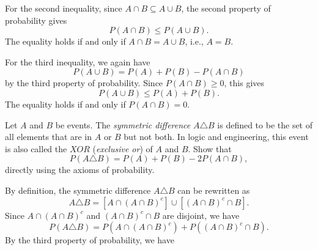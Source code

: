 {\begin{solution}
\begin{Proof}
            For the second inequality, since $A \cap B \subseteq A \cup B$, the second property of probability gives 
            \begin{equation*}
                P(A \cap B) \leq P(A \cup B). 
            \end{equation*}
            The equality holds if and only if $A \cap B = A \cup B$, i.e., $A = B$. 

            For the third inequality, we again have 
            \begin{equation*}
                P(A \cup B) = P(A) + P(B) - P(A \cap B) 
            \end{equation*}
            by the third property of probability. Since $P(A \cap B) \geq 0$, this gives 
            \begin{equation*}
                P(A \cup B) \leq P(A) + P(B). 
            \end{equation*}
            The equality holds if and only if $P(A \cap B) = 0$. 
        \end{Proof}
    \end{solution}
    \item%
    \item%
    Let $A$ and $B$ be events. 
    The \textit{symmetric difference} $A \triangle B$ is defined to be the set of all elements that are in $A$ or $B$ but not both. 
    In logic and engineering, this event is also called the $XOR$ (\textit{exclusive or}) of $A$ and $B$. 
    Show that 
    \begin{equation*}
        P(A \triangle B) = P(A) + P(B) - 2 P(A \cap B), 
    \end{equation*}
    directly using the axioms of probability. 
    \begin{solution}
        \begin{Proof}
            By definition, the symmetric difference $A \triangle B$ can be rewritten as 
            \begin{equation*}
                A \triangle B = [A \cap (A \cap B)^c] \cup [(A \cap B)^c \cap B]. 
            \end{equation*}
            Since $A \cap (A \cap B)^c$ and $(A \cap B)^c \cap B$ are disjoint, we have 
            \begin{equation*}
                P(A \triangle B) = P(A \cap (A \cap B)^c) + P((A \cap B)^c \cap B). 
            \end{equation*}
            By the third property of probability, we have
            \begin{equation*}

\end{equation*}
\end{Proof}
\end{solution}}
